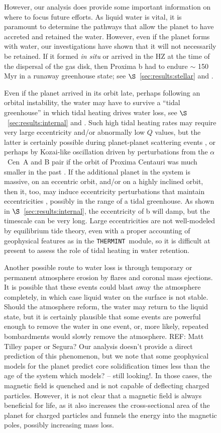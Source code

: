 \documentclass[preprint,12pt]{aastex}
\newcommand{\xxx}[1]{{\color{red} #1}} %
\def\acen{{$\alpha$~Cen}}
\def\thermint{\texttt{\footnotesize{THERMINT}}\xspace}
\begin{document}
\begin{figure}
{However, our analysis does provide some important information on where
to focus future efforts. As liquid water is vital, it is paramount to
determine the pathways that allow the planet to have accreted and
retained the water. However, even if the planet forms with water, our
investigations have shown that it will not necessarily be retained. If
it formed {\it in situ} or arrived in the HZ at the time of the
dispersal of the gas disk, then Proxima b had to endure $\sim$ 150
Myr in a runaway greenhouse state; see $\S$~\ref{sec:results:stellar} and
\cite{LugerBarnes15}.

Even if the planet arrived in its orbit late, perhaps following an
orbital instability, the water may have to survive a ``tidal
greenhouse'' in which tidal heating drives water loss, see
$\S$~\ref{sec:results:internal} and \cite{Barnes13}. Such high tidal heating
rates may require very large eccentricity and/or abnormally low $Q$
values, but the latter is certainly possible during planet-planet
scattering events \citep{Chatterjee08}, or perhaps by Kozai-like
oscillation driven by perturbations from the \acen~A and B pair if the
orbit of Proxima Centauri was much smaller in the past
\citep{DesideraBarbieri07}. If the additional planet in the system is
massive, on an eccentric orbit, and/or on a highly inclined orbit,
then it, too, may induce eccentricity perturbations that maintain
eccentricities \citep{TakedaRasio05}, possibly in the range of a tidal
greenhouse. As shown in $\S$~\ref{sec:results:internal}, the eccentricity of
b will damp, but the timescale can be very long. Large eccentricities
are not well-modeled by equilibrium tide theory, even with a proper
accounting of geophysical features as in the \thermint~module, so it
is difficult at present to assess the role of tidal heating in water
retention.

Another possible route to water loss is through temporary or permanent
atmosphere erosion by flares and coronal mass ejections. It is
possible that these events could blast away the atmosphere completely,
in which case liquid water on the surface is not stable. Should the
atmosphere reform, the water may return to the liquid state, but it is
certainly plausible that some events are powerful enough to remove the
water in one event, or, more likely, repeated bombardments would
slowly remove the atmosphere. \xxx{REF: Matt Tilley paper or Segura?} Our analysis doesn't provide a direct
prediction of this phenomenon, but we note that some geophysical
models for the planet predict core solidification times less than the
age of the system \xxx{which models? -- still looking!}. In those cases, the magnetic field is quenched and
is not capable of deflecting charged particles. However, it is not
clear that a magnetic field is always beneficial for life, as it also
increases the cross-sectional area of the planet for charged particles
and funnels the energy into the magnetic poles, possibly increasing
mass loss.

}
\end{figure}
\end{document}
